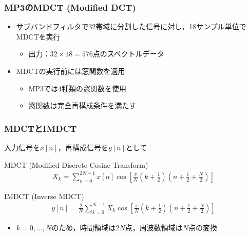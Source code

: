 \documentclass[14pt,xcolor=dvipsnames,table,dvipdfmx]{beamer}
\begin{document}
\begin{frame}[c]
    \frametitle{MP3のMDCT (Modified DCT)}
    \begin{itemize}
        \item サブバンドフィルタで32帯域に分割した信号に対し，18サンプル単位でMDCTを実行
            \begin{itemize}
                \item 出力：$32 \times 18 = 576$点のスペクトルデータ
            \end{itemize}
        \item MDCTの実行前には窓関数を適用
            \begin{itemize}
                \item MP3では4種類の窓関数を使用
                \item 窓関数は完全再構成条件を満たす
            \end{itemize}
    \end{itemize}
\end{frame}

\begin{frame}[c]
    \frametitle{MDCTとIMDCT}
    入力信号を$x[n]$，再構成信号を$y[n]$として
    \begin{block}{MDCT (Modified Discrete Cosine Transform)}
        \vspace{-15pt}
        \begin{align}
            X_{k} = \sum_{n = 0}^{2N - 1} x[n] \cos\left[ \frac{\pi}{N} \left( k + \frac{1}{2} \right) \left( n + \frac{1}{2} + \frac{N}{2} \right) \right] \label{eq:mdct}
        \end{align}
    \end{block}
    \begin{block}{IMDCT (Inverse MDCT)}
        \vspace{-15pt}
        \begin{align}
            y[n] = \frac{2}{N} \sum_{k = 0}^{N - 1} X_{k} \cos\left[ \frac{\pi}{N} \left( k + \frac{1}{2} \right) \left( n + \frac{1}{2} + \frac{N}{2} \right) \right] \label{eq:imdct}
        \end{align}
    \end{block}
    \begin{itemize}
        \item $k = 0, ..., N$のため，時間領域は$2N$点，周波数領域は$N$点の変換
    \end{itemize}
\end{frame}
\end{document}
